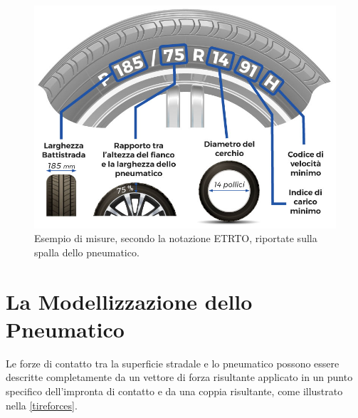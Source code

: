 \begin{figure}[h]
	\centering
	\includegraphics[width=0.7\linewidth]{Figures/tire_measures}
	\caption{Esempio di misure, secondo la notazione \ac{ETRTO}, riportate sulla spalla dello pneumatico.}
	\label{tiremeasures}
\end{figure}
%
\section{La Modellizzazione dello Pneumatico}
Le forze di contatto tra la superficie stradale e lo pneumatico possono essere descritte completamente da un vettore di forza risultante applicato in un punto specifico dell'impronta di contatto e da una coppia risultante, come illustrato nella \figurename{  \ref{tireforces}}.


